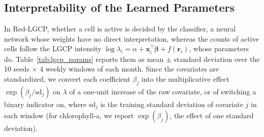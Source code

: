 \subsection{Interpretability of the Learned Parameters}
\label{app:interpretability}

In Red-LGCP, whether a cell is active is decided by the classifier, a neural network whose weights have no direct interpretation, whereas the counts of active cells follow the LGCP intensity $\log\lambda_i=\alpha+\mathbf{x}_i^\top\boldsymbol{\beta}+f(\mathbf{r}_i)$, whose parameters do. Table~\ref{tab:lgcp_params} reports them as mean $\pm$ standard deviation over the 10 seeds $\times$ 4 weekly windows of each month. Since the covariates are standardized, we convert each coefficient $\beta_j$ into the multiplicative effect $\exp(\beta_j/\mathrm{sd}_j)$ on $\lambda$ of a one-unit increase of the raw covariate, or of switching a binary indicator on, where $\mathrm{sd}_j$ is the training standard deviation of covariate $j$ in each window (for chlorophyll-a, we report $\exp(\beta_j)$, the effect of one standard deviation).

